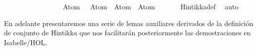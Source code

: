 \begin{isabellebody}
\ \ \ \ \ \ \ \ \ \ \ \ \ \ \ \ \ Atom\ {}{\isacharcomma}\ \isactrlbold {\isasymnot}{\isacharparenleft}\isactrlbold {\isasymnot}\ {\isacharparenleft}Atom\ {}{\isacharparenright}{\isacharparenright}{\isacharcomma}\ Atom\ {}{\isacharcomma}\ \isactrlbold {\isasymnot}{\isacharparenleft}Atom\ {}{\isacharparenright}{\isacharbraceright}{\isachardoublequoteclose}\isanewline
\ \ \ \ \isamarkupfalse%
\ Hintikka{\isacharunderscore}def\ \isamarkupfalse%
\ auto%
\endisatagproof
{\isafoldproof}%
%
\isadelimproof
\isanewline
%
\endisadelimproof
\isanewline
{}\isamarkupfalse%
%
\begin{isamarkuptext}%
En adelante presentaremos una serie de lemas auxiliares
  derivados de la definición de conjunto de Hintikka que nos facilitarán
  posteriormente las demostraciones en Isabelle/HOL.


\end{isamarkuptext}
\end{isabellebody}
